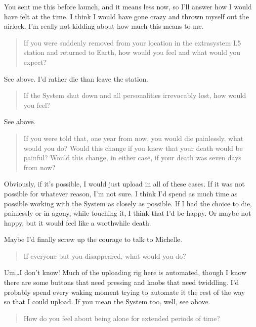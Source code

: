 \noindent You sent me this before launch, and it means less now, so I'll answer how I would have felt at the time. I think I would have gone crazy and thrown myself out the airlock. I'm really not kidding about how much this means to me.

\begin{quote}
If you were suddenly removed from your location in the extrasystem L5 station and returned to Earth, how would you feel and what would you expect?
\end{quote}

\noindent See above. I'd rather die than leave the station.

\begin{quote}
If the System shut down and all personalities irrevocably lost, how would you feel?
\end{quote}

\noindent See above.

\begin{quote}
If you were told that, one year from now, you would die painlessly, what would you do? Would this change if you knew that your death would be painful? Would this change, in either case, if your death was seven days from now?
\end{quote}

\noindent Obviously, if it's possible, I would just upload in all of these cases. If it was not possible for whatever reason, I'm not sure. I think I'd spend as much time as possible working with the System as closely as possible. If I had the choice to die, painlessly or in agony, while touching it, I think that I'd be happy. Or maybe not happy, but it would feel like a worthwhile death.

Maybe I'd finally screw up the courage to talk to Michelle.

\begin{quote}
If everyone but you disappeared, what would you do?
\end{quote}

\noindent Um\ldots I don't know! Much of the uploading rig here is automated, though I know there are some buttons that need pressing and knobs that need twiddling. I'd probably spend every waking moment trying to automate it the rest of the way so that I could upload. If you mean the System too, well, see above.

\begin{quote}
How do you feel about being alone for extended periods of time?
\end{quote}

